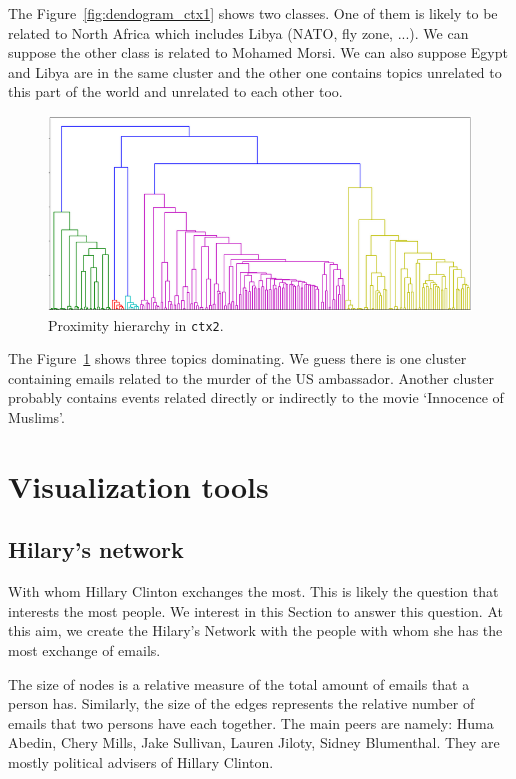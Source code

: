 \documentclass[11pt]{article}
\begin{document}
The Figure~\ref{fig:dendogram_ctx1} shows two classes. One of them is likely to be related to North Africa which includes Libya (NATO, fly zone, ...). We can suppose the other class is related to Mohamed Morsi. We can also suppose Egypt and Libya are in the same cluster and the other one contains topics unrelated to this part of the world and unrelated to each other too.

\begin{figure}[h]
	\centering
	\includegraphics[width=\linewidth]{images/dendogram_ctx2.png}
	\caption{Proximity hierarchy in \texttt{ctx2}.}
	\label{fig:dendogram_ctx2}
\end{figure}

The Figure~\ref{fig:dendogram_ctx2} shows three topics dominating. We guess there is one cluster containing emails related to the murder of the US ambassador. Another cluster probably contains events related directly or indirectly to the movie `Innocence of Muslims'.

\section{Visualization tools}

\subsection{Hilary's network}

With whom Hillary Clinton exchanges the most. This is likely the question that interests the most people. We interest in this Section to answer this question. At this aim, we create the Hilary's Network with the people with whom she has the most exchange of emails.

The size of nodes is a relative measure of the total amount of emails that a person has. Similarly, the size of the edges represents the relative number of emails that two persons have each together. The main peers are namely: Huma Abedin, Chery Mills, Jake Sullivan, Lauren Jiloty, Sidney Blumenthal. They are mostly political advisers of Hillary Clinton.
\end{document}
